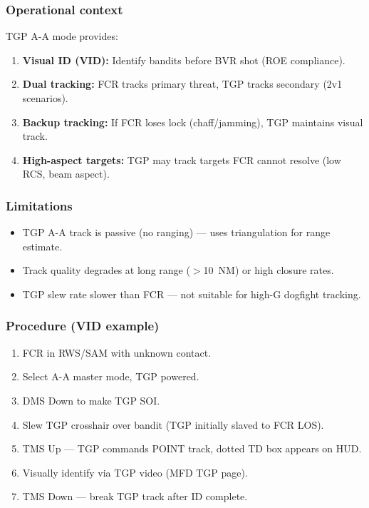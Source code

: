 \documentclass[11pt, a4paper, twoside]{report}
\begin{document}
\subsubsection*{Operational context}
\label{sec:C4-S3-S6-S3}

TGP A-A mode provides:
\begin{enumerate}[nosep]
    \item \textbf{Visual ID (VID):} Identify bandits before BVR shot (ROE compliance).
    \item \textbf{Dual tracking:} FCR tracks primary threat, TGP tracks secondary (2v1 scenarios).
    \item \textbf{Backup tracking:} If FCR loses lock (chaff/jamming), TGP maintains visual track.
    \item \textbf{High-aspect targets:} TGP may track targets FCR cannot resolve (low RCS, 
          beam aspect).
\end{enumerate}

\subsubsection*{Limitations}
\label{sec:C4-S3-S6-S4}

\begin{itemize}[nosep]
    \item TGP A-A track is passive (no ranging) --- uses triangulation for range estimate.
    \item Track quality degrades at long range ($>$10~NM) or high closure rates.
    \item TGP slew rate slower than FCR --- not suitable for high-G dogfight tracking.
\end{itemize}

\subsubsection*{Procedure (VID example)}
\label{sec:C4-S3-S6-S5}

\begin{enumerate}[nosep]
    \item FCR in RWS/SAM with unknown contact.
    \item Select A-A master mode, TGP powered.
    \item DMS Down to make TGP SOI.
    \item Slew TGP crosshair over bandit (TGP initially slaved to FCR LOS).
    \item TMS Up --- TGP commands POINT track, dotted TD box appears on HUD.
    \item Visually identify via TGP video (MFD TGP page).
    \item TMS Down --- break TGP track after ID complete.
\end{enumerate}
\end{document}
